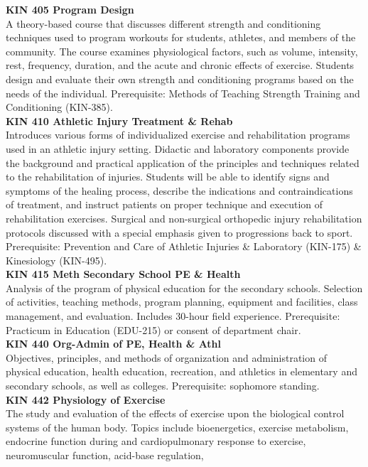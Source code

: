 \documentclass[
  letterpaper,
]{scrbook}
\begin{document}
\textbf{KIN 405 Program Design}\\
A theory-based course that discusses different strength and conditioning
techniques used to program workouts for students, athletes, and members
of the community. The course examines physiological factors, such as
volume, intensity, rest, frequency, duration, and the acute and chronic
effects of exercise. Students design and evaluate their own strength and
conditioning programs based on the needs of the individual.
Prerequisite: Methods of Teaching Strength Training and Conditioning
(KIN-385).\\
\textbf{KIN 410 Athletic Injury Treatment \& Rehab}\\
Introduces various forms of individualized exercise and rehabilitation
programs used in an athletic injury setting. Didactic and laboratory
components provide the background and practical application of the
principles and techniques related to the rehabilitation of injuries.
Students will be able to identify signs and symptoms of the healing
process, describe the indications and contraindications of treatment,
and instruct patients on proper technique and execution of
rehabilitation exercises. Surgical and non-surgical orthopedic injury
rehabilitation protocols discussed with a special emphasis given to
progressions back to sport. Prerequisite: Prevention and Care of
Athletic Injuries \& Laboratory (KIN-175) \& Kinesiology (KIN-495).\\
\textbf{KIN 415 Meth Secondary School PE \& Health}\\
Analysis of the program of physical education for the secondary schools.
Selection of activities, teaching methods, program planning, equipment
and facilities, class management, and evaluation. Includes 30-hour field
experience. Prerequisite: Practicum in Education (EDU-215) or consent of
department chair.\\
\textbf{KIN 440 Org-Admin of PE, Health \& Athl}\\
Objectives, principles, and methods of organization and administration
of physical education, health education, recreation, and athletics in
elementary and secondary schools, as well as colleges. Prerequisite:
sophomore standing.\\
\textbf{KIN 442 Physiology of Exercise}\\
The study and evaluation of the effects of exercise upon the biological
control systems of the human body. Topics include bioenergetics,
exercise metabolism, endocrine function during and cardiopulmonary
response to exercise, neuromuscular function, acid-base regulation,
\end{document}
